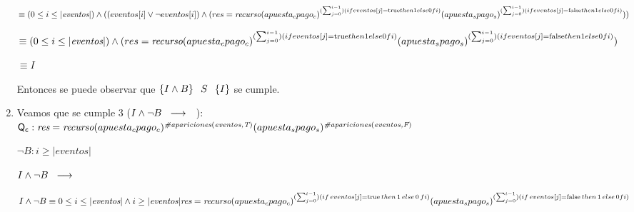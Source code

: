\documentclass[10pt,a4paper]{article}
\begin{document}
\begin{enumerate}
        $\equiv (0 \leq i \leq |\textit{eventos}\vert) \land 
        ((eventos[i] \lor \neg eventos[i]) \land \\
        (res = \textit{recurso}(\textit{$apuesta_{c}$}\textit{$pago_{c}$})^{(\sum_{j = 0}^{i-1})(if eventos[j] = \mathrm{true}  then 1 else 0  fi)}(\textit{$apuesta_{s}$}\textit{$pago_{s}$})^{(\sum_{j = 0}^{i-1})(if eventos[j] = \mathrm{false} then 1 else 0 fi)})
        ) 
        $

        $\equiv (0 \leq i \leq |\textit{eventos}\vert) \land \\
        (res = \textit{recurso}(\textit{$apuesta_{c}$}\textit{$pago_{c}$})^{(\sum_{j = 0}^{i-1})(if eventos[j] = \mathrm{true}  then 1 else 0  fi)}(\textit{$apuesta_{s}$}\textit{$pago_{s}$})^{(\sum_{j = 0}^{i-1})(if eventos[j] = \mathrm{false} then 1 else 0 fi)})
        $

        $\equiv I $

        Entonces se puede observar que $\left\lbrace I \land B \right\rbrace \hspace{2mm} S \hspace{2mm} \left\lbrace I \right\rbrace$ \hspace{1mm} se cumple.

        \item Veamos que se cumple 3 ($I \land \neg B \hspace{2mm} \longrightarrow \hspace{2mm} $ \postcondicion):\\
        
        $\mathsf{Q_{c}}: \textit{res}=\textit{recurso}(\textit{$apuesta_{c}$}\textit{$pago_{c}$})^{\textit{\#apariciones}(\textit{eventos,T})}(\textit{$apuesta_{s}$}\textit{$pago_{s}$})^{\textit{\#apariciones}(\textit{eventos,F})}$

        $\neg B: i \geq |{\textit{eventos}}\vert$

        $I \land \neg B \hspace{2mm} \longrightarrow \hspace{2mm} $ \postcondicion

        $I \land \neg B \equiv  0 \leq i \leq |\textit{eventos}\vert \land i \geq |\textit{eventos}\vert \\
        \textit{res} = \textit{recurso}(\textit{$apuesta_{c}$}\textit{$pago_{c}$})^{(\sum_{j = 0}^{i -1})(if \hspace{0.5mm} eventos[j] = \mathrm{true} \hspace{0.5mm} then \hspace{0.5mm} 1 \hspace{0.5mm} else \hspace{0.5mm} 0 \hspace{0.5mm} fi)}
        (\textit{$apuesta_{s}$}\textit{$pago_{s}$})^{(\sum_{j = 0}^{i -1})(if \hspace{0.5mm} eventos[j] = \mathrm{false} \hspace{0.5mm} then  \hspace{0.5mm} 1  \hspace{0.5mm} else \hspace{0.5mm} 0 fi)}$\\


\end{enumerate}
\end{document}
